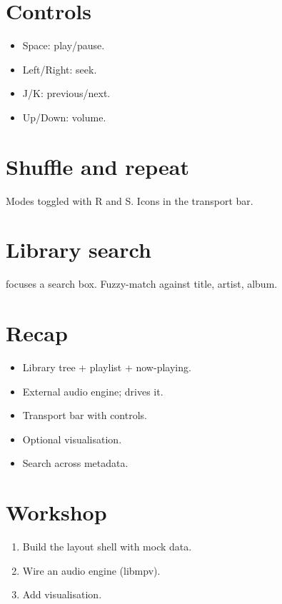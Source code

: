 \section{Controls}

\begin{itemize}[leftmargin=*]
  \item Space: play/pause.
  \item Left/Right: seek.
  \item J/K: previous/next.
  \item Up/Down: volume.
\end{itemize}

\section{Shuffle and repeat}

Modes toggled with R and S. Icons in the transport bar.

\section{Library search}

\code{/} focuses a search box. Fuzzy-match against title,
artist, album.

\section{Recap}

\begin{recap}
\begin{itemize}[leftmargin=*]
  \item Library tree + playlist + now-playing.
  \item External audio engine; \maya{} drives it.
  \item Transport bar with controls.
  \item Optional visualisation.
  \item Search across metadata.
\end{itemize}
\end{recap}

\section*{Workshop}

\begin{enumerate}[leftmargin=*]
  \item Build the layout shell with mock data.
  \item Wire an audio engine (libmpv).
  \item Add visualisation.
\end{enumerate}

